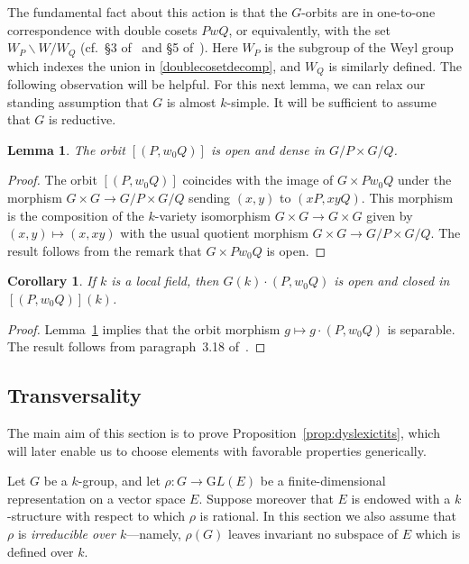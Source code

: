 \documentclass{amsart}
\theoremstyle{plain}
\newtheorem{lemma}[theorem]{Lemma}
\newtheorem{corollary}[theorem]{Corollary}
\theoremstyle{definition}
\theoremstyle{remark}
\begin{document}
The fundamental fact about this action is that the $G$-orbits
are in one-to-one correspondence with double cosets $PwQ$, or equivalently, with the set
$W_{P}\backslash W/W_{Q}$ (cf.\ \S3 of~\cite{MR0430094} and \S5 of~\cite{MR0207712}). Here
$W_{P}$ is the subgroup of the Weyl group which indexes
the union in \eqref{doublecosetdecomp}, and $W_{Q}$ is similarly defined. The following
observation will be helpful. For this next lemma, we can relax our standing assumption that
$G$ is almost $k$-simple. It will be sufficient to assume that $G$ is reductive.

\begin{lemma}\label{lem:openorbit}
The orbit $[(P, w_{0}Q)]$ is open and dense in $G/P \times G/Q$.
\end{lemma}
\begin{proof}
The orbit $[(P, w_{0}Q)]$ coincides with the image of $G \times Pw_{0}Q$ under the morphism
$G \times G \to G/P \times G/Q$ sending $(x, y)$ to $(xP, xyQ)$. This morphism is the
composition of the $k$-variety isomorphism $G \times G \to G \times G$ given by $(x, y)
\mapsto (x, xy)$ with the usual quotient morphism $G \times G \to G/P \times G/Q$. The
result follows from the remark that $G \times Pw_{0}Q$ is open.
\end{proof}
\begin{corollary}\label{cor:GkOpenOrbit}
If $k$ is a local field, then $G(k) \cdot (P, w_{0}Q)$ is open and closed in $[(P,
w_{0}Q)](k)$.
\end{corollary}
\begin{proof}
Lemma~\ref{lem:openorbit} implies that the orbit morphism $g \mapsto g \cdot
(P, w_{0}Q)$ is separable. The result follows from paragraph~3.18 of~\cite{MR0316587}.
\end{proof}
  

\subsection{Transversality}\label{sec:Transversality}
The main aim of this section is to
prove Proposition~\ref{prop:dyslexictits},
which will later enable us to choose elements with favorable properties generically.

Let $G$ be a $k$-group, and let $\rho: G \to
{\mathrm GL}(E)$ be a finite-dimensional representation on a vector space $E$. Suppose
moreover
that $E$ is endowed with a $k$-structure with respect to which $\rho$ is rational. In
this section we also assume that $\rho$ is \emph{irreducible over $k$}---namely, $\rho(G)$
leaves invariant no subspace of $E$ which is defined over $k$.
\end{document}
